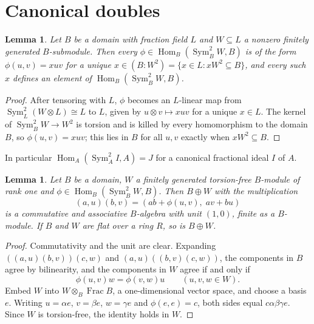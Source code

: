\documentclass{amsart}
\newtheorem{lemma}[theorem]{Lemma}
\theoremstyle{definition}
\theoremstyle{remark}
\numberwithin{equation}{section}
\DeclareMathOperator{\Hom}{Hom}
\DeclareMathOperator{\Sym}{Sym}
\DeclareMathOperator{\Frac}{Frac}
\begin{document}
\section{Canonical doubles}\label{sec:doubles}

\begin{lemma}\label{lem:hom}
Let $B$ be a domain with fraction field $L$ and $W\subseteq L$ a nonzero finitely generated $B$-submodule. Then every $\phi\in\Hom_B(\Sym^2_BW,B)$ is of the form $\phi(u,v)=xuv$ for a unique $x\in(B:W^2)=\{x\in L:xW^2\subseteq B\}$, and every such $x$ defines an element of $\Hom_B(\Sym^2_BW,B)$.
\end{lemma}

\begin{proof}
After tensoring with $L$, $\phi$ becomes an $L$-linear map from $\Sym^2_L(W\otimes L)\cong L$ to $L$, given by $u\otimes v\mapsto xuv$ for a unique $x\in L$. The kernel of $\Sym^2_BW\to W^2$ is torsion and is killed by every homomorphism to the domain $B$, so $\phi(u,v)=xuv$; this lies in $B$ for all $u,v$ exactly when $xW^2\subseteq B$.
\end{proof}

In particular $\Hom_A(\Sym^2_AI,A)=J$ for a canonical fractional ideal $I$ of $A$.

\begin{lemma}\label{lem:assoc}
Let $B$ be a domain, $W$ a finitely generated torsion-free $B$-module of rank one and $\phi\in\Hom_B(\Sym^2_BW,B)$. Then $B\oplus W$ with the multiplication
\begin{equation}\label{eq:mult}
(a,u)(b,v)=(ab+\phi(u,v),\;av+bu)
\end{equation}
is a commutative and associative $B$-algebra with unit $(1,0)$, finite as a $B$-module. If $B$ and $W$ are flat over a ring $R$, so is $B\oplus W$.
\end{lemma}

\begin{proof}
Commutativity and the unit are clear. Expanding $((a,u)(b,v))(c,w)$ and $(a,u)((b,v)(c,w))$, the components in $B$ agree by bilinearity, and the components in $W$ agree if and only if
\[
\phi(u,v)w=\phi(v,w)u\qquad(u,v,w\in W).
\]
Embed $W$ into $W\otimes_B\Frac B$, a one-dimensional vector space, and choose a basis $e$. Writing $u=\alpha e$, $v=\beta e$, $w=\gamma e$ and $\phi(e,e)=c$, both sides equal $c\alpha\beta\gamma e$. Since $W$ is torsion-free, the identity holds in $W$.
\end{proof}
\end{document}
